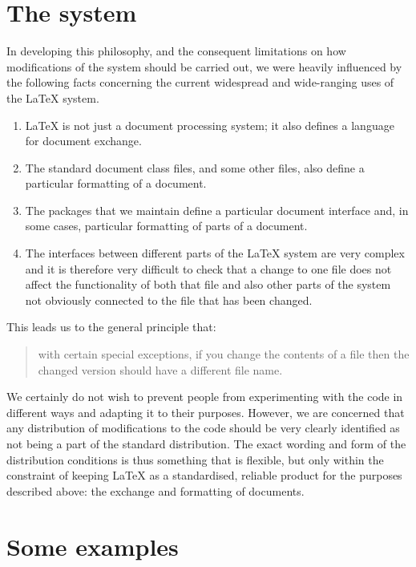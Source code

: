 \documentclass{ltxguide}[1995/11/28]
\begin{document}
\section{The system}
\label{sec:sys}

In developing this philosophy, and the consequent limitations on how
modifications of the system should be carried out, we were heavily
influenced by the following facts concerning the current widespread
and wide-ranging uses of the \LaTeX{} system.
\begin{enumerate}
\item  \LaTeX{} is not just a document processing system;
  it also defines a language for document exchange.

\item The standard document class files, and some other files, also
  define a particular formatting of a document.

\item  The packages that we maintain define a particular document
  interface and, in some cases, particular formatting of parts of a
  document.

\item The interfaces between different parts of the \LaTeX{} system
  are very complex and it is therefore very difficult to check that a
  change to one file does not affect the functionality of both that
  file and also other parts of the system not obviously connected to
  the file that has been changed.
\end{enumerate}

This leads us to the general principle that:
\begin{quote}
  with certain special exceptions, if you change the contents of a
  file then the changed version should have a different file name.
\end{quote}

We certainly do not wish to prevent people from experimenting with the
code in different ways and adapting it to their purposes.  However, we
are concerned that any distribution of modifications to the code
should be very clearly identified as not being a part of the standard
distribution.  The exact wording and form of the distribution
conditions is thus something that is flexible, but only within the
constraint of keeping \LaTeX{} as a standardised, reliable product for
the purposes described above: the exchange and formatting of
documents.


\section{Some examples}
\label{sec:expl}
\end{document}

